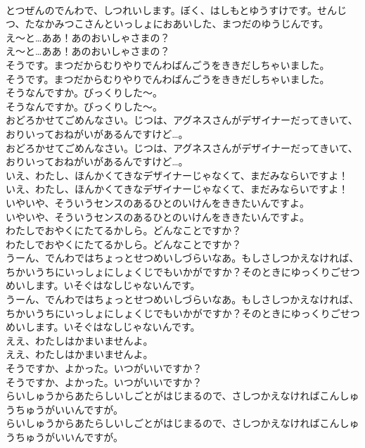 \documentclass[8pt]{extreport}
\begin{document}
\begin{CJK}{UTF8}{min}
\\	とつぜんのでんわで、しつれいします。ぼく、はしもとゆうすけです。せんじつ、たなかみつこさんといっしょにおあいした、まつだのゆうじんです。
\\	え～と…ああ！あのおいしゃさまの？
\\	え～と…ああ！あのおいしゃさまの？
\\	そうです。まつだからむりやりでんわばんごうをききだしちゃいました。
\\	そうです。まつだからむりやりでんわばんごうをききだしちゃいました。
\\	そうなんですか。びっくりした～。
\\	そうなんですか。びっくりした～。
\\	おどろかせてごめんなさい。じつは、アグネスさんがデザイナーだってきいて、おりいっておねがいがあるんですけど…。
\\	おどろかせてごめんなさい。じつは、アグネスさんがデザイナーだってきいて、おりいっておねがいがあるんですけど…。
\\	いえ、わたし、ほんかくてきなデザイナーじゃなくて、まだみならいですよ！
\\	いえ、わたし、ほんかくてきなデザイナーじゃなくて、まだみならいですよ！
\\	いやいや、そういうセンスのあるひとのいけんをききたいんですよ。
\\	いやいや、そういうセンスのあるひとのいけんをききたいんですよ。
\\	わたしでおやくにたてるかしら。どんなことですか？
\\	わたしでおやくにたてるかしら。どんなことですか？
\\	うーん、でんわではちょっとせつめいしづらいなあ。もしさしつかえなければ、ちかいうちにいっしょにしょくじでもいかがですか？そのときにゆっくりごせつめいします。いそぐはなしじゃないんです。
\\	うーん、でんわではちょっとせつめいしづらいなあ。もしさしつかえなければ、ちかいうちにいっしょにしょくじでもいかがですか？そのときにゆっくりごせつめいします。いそぐはなしじゃないんです。
\\	ええ、わたしはかまいませんよ。
\\	ええ、わたしはかまいませんよ。
\\	そうですか、よかった。いつがいいですか？
\\	そうですか、よかった。いつがいいですか？
\\	らいしゅうからあたらしいしごとがはじまるので、さしつかえなければこんしゅうちゅうがいいんですが。
\\	らいしゅうからあたらしいしごとがはじまるので、さしつかえなければこんしゅうちゅうがいいんですが。

\end{CJK}
\end{document}
